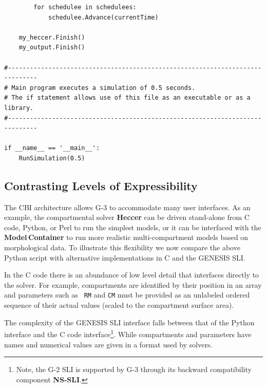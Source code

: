 \documentclass[10pt]{article}
\begin{document}
\begin{verbatim}
        for schedulee in schedulees:
            schedulee.Advance(currentTime)

    my_heccer.Finish()
    my_output.Finish()
  
#------------------------------------------------------------------------------
# Main program executes a simulation of 0.5 seconds.
# The if statement allows use of this file as an executable or as a library.
#------------------------------------------------------------------------------

if __name__ == '__main__':
    RunSimulation(0.5)
\end{verbatim}



\subsection*{Contrasting Levels of Expressibility}

The CBI architecture allows G-3 to accommodate many user
interfaces.  As an example, the compartmental solver {\bf Heccer} can be driven
stand-alone from C code, Python, or Perl to run the simplest
models, or it can be interfaced with the {\bf Model\,Container} to
run more realistic multi-compartment models based on morphological
data. To illustrate this flexibility we now compare the above Python
script with alternative implementations in C and the GENESIS SLI.

In the C code there is an abundance of low level detail that
interfaces directly to the solver.  For example, compartments are
identified by their position in an array and parameters such as {\tt
  RM} and {\tt CM} must be provided as an unlabeled ordered sequence
of their actual values (scaled to the compartment surface area).

The complexity of the GENESIS SLI interface falls between that of the
Python interface and the C code interface\footnote{Note,
 the G-2 SLI is supported by G-3 through its backward compatibility
  component {\bf NS-SLI}.}.  While
compartments and parameters have names and numerical values are given in
a format used by solvers.
\end{document}
